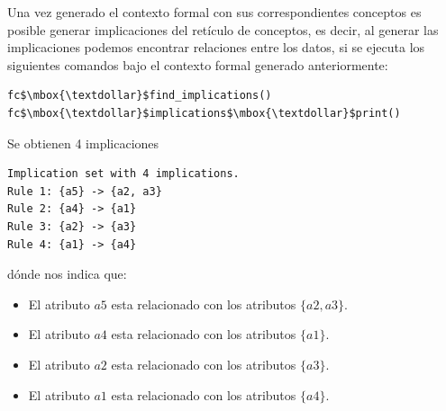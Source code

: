 \documentclass[../../main.tex]{subfiles}
\begin{document}
\vskip 0.2in

Una vez generado el contexto formal con sus correspondientes conceptos es posible generar implicaciones del retículo de conceptos, es decir, al generar las implicaciones podemos encontrar relaciones entre los datos, si se ejecuta los siguientes comandos bajo el contexto formal generado anteriormente:

\vskip 0.2in

\begin{lstlisting}[mathescape]
fc$\mbox{\textdollar}$find_implications()
fc$\mbox{\textdollar}$implications$\mbox{\textdollar}$print()
\end{lstlisting}

\vskip 0.2in
\newpage
Se obtienen 4 implicaciones

\begin{lstlisting}
Implication set with 4 implications.
Rule 1: {a5} -> {a2, a3}
Rule 2: {a4} -> {a1}
Rule 3: {a2} -> {a3}
Rule 4: {a1} -> {a4}
\end{lstlisting}

\vskip 0.2in

dónde nos indica que:

\begin{itemize}
    \item El atributo $a5$ esta relacionado con los atributos $\{ a2,a3 \}$.
    \item El atributo $a4$ esta relacionado con los atributos $\{ a1 \}$.
    \item El atributo $a2$ esta relacionado con los atributos $\{ a3 \}$.
    \item El atributo $a1$ esta relacionado con los atributos $\{ a4 \}$.
\end{itemize}
\end{document}
